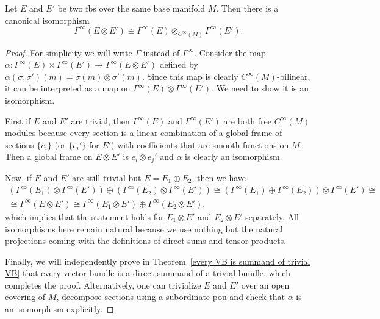 \begin{prop}\label{sections of tensor products}
    Let $E$ and $E'$ be two \glspl{fb} over the same base manifold $M$. Then there is a canonical isomorphism
    \[\Gamma^\infty(E\otimes E')\cong \Gamma^\infty(E)\otimes_{C^\infty(M)}\Gamma^\infty(E').\]
\end{prop}
\begin{proof}
    For simplicity we will write $\Gamma$ instead of $\Gamma^\infty$. Consider the map $\alpha:\Gamma^\infty(E)\times\Gamma^\infty(E')\to\Gamma^\infty(E\otimes E')$ defined by $\alpha(\sigma,\sigma')(m)=\sigma(m)\otimes\sigma'(m)$. Since this map is clearly $C^\infty(M)$-bilinear, it can be interpreted as a map on $\Gamma^\infty(E)\otimes\Gamma^\infty(E')$. We need to show it is an isomorphism.
    
    First if $E$ and $E'$ are trivial, then $\Gamma^\infty(E)$ and $\Gamma^\infty(E')$ are both free $C^\infty(M)$ modules because every section is a linear combination of a global frame of sections $\{e_i\}$ (or $\{e_i'\}$ for $E'$) with coefficients that are smooth functions on $M$. Then a global frame on $E\otimes E'$ is $e_i\otimes e_j'$ and $\alpha$ is clearly an isomorphism.
    
    Now, if $E$ and $E'$ are still trivial but $E=E_1\oplus E_2$, then we have 
    \begin{multline}
        (\Gamma^\infty(E_1)\otimes\Gamma^\infty(E'))\oplus(\Gamma^\infty(E_2)\otimes\Gamma^\infty(E'))\cong (\Gamma^\infty(E_1)\oplus\Gamma^\infty(E_2))\otimes\Gamma^\infty(E')\cong\\ \cong \Gamma^\infty(E\otimes E')\cong \Gamma^\infty(E_1\otimes E')\oplus\Gamma^\infty(E_2\otimes E'),
    \end{multline}
    which implies that the statement holds for $E_1\otimes E'$ and $E_2\otimes E'$ separately. All isomorphisms here remain natural because we use nothing but the natural projections coming with the definitions of direct sums and tensor products.
    
    Finally, we will independently prove in Theorem~\ref{every VB is summand of trivial VB} that every vector bundle is a direct summand of a trivial bundle, which completes the proof. Alternatively, one can trivialize $E$ and $E'$ over an open covering of $M$, decompose sections using a subordinate \gls{pou} and check that $\alpha$ is an isomorphism explicitly.
\end{proof}



